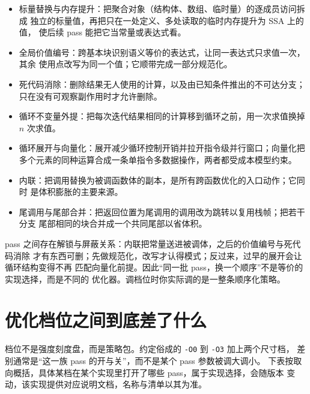 \documentclass[12pt,a4paper,fontset=fandol]{ctexbook}
\newcommand{\Sw}[1]{\texttt{#1}}
\newcommand{\Mx}[1]{\textsf{#1}}
\begin{document}
\begin{itemize}
  \item 标量替换与内存提升：把聚合对象（结构体、数组、临时量）的逐成员访问拆成
        独立的标量值，再把只在一处定义、多处读取的临时内存提升为 \Mx{SSA} 上的值，
        使后续 \Mx{pass} 能把它当常量或表达式看。
  \item 全局价值编号：跨基本块识别语义等价的表达式，让同一表达式只求值一次，其余
        使用点改写为同一个值；它顺带完成一部分规范化。
  \item 死代码消除：删除结果无人使用的计算，以及由已知条件推出的不可达分支；
        只在没有可观察副作用时才允许删除。
  \item 循环不变量外提：把每次迭代结果相同的计算移到循环之前，用一次求值换掉
        $n$ 次求值。
  \item 循环展开与向量化：展开减少循环控制开销并拉开指令级并行窗口；向量化把
        多个元素的同种运算合成一条单指令多数据操作，两者都受成本模型约束。
  \item 内联：把调用替换为被调函数体的副本，是所有跨函数优化的入口动作；它同时
        是体积膨胀的主要来源。
  \item 尾调用与尾部合并：把返回位置为尾调用的调用改为跳转以复用栈帧；把若干分支
        尾部相同的块合并成一个共同尾部以省体积。
\end{itemize}

\begin{guideline}[title={顺序本身就是策略}]
\Mx{pass} 之间存在解锁与屏蔽关系：内联把常量送进被调体，之后的价值编号与死代码消除
才有东西可删；先做规范化，改写才认得模式；反过来，过早的展开会让循环结构变得不再
匹配向量化前提。因此“同一批 \Mx{pass}，换一个顺序”不是等价的实现选择，而是不同的
优化器。调档位时你实际调的是一整条顺序化策略。
\end{guideline}

\section{优化档位之间到底差了什么}\label{sec:cl05-levels}

档位不是强度刻度盘，而是策略包。约定俗成的 \Sw{-O0} 到 \Sw{-O3} 加上两个尺寸档，
差别通常是“这一族 \Mx{pass} 的开与关”，而不是某个 \Mx{pass} 参数被调大调小。
下表按取向概括，具体某档在某个实现里打开了哪些 \Mx{pass}，属于实现选择，会随版本
变动，该实现提供对应说明文档，名称与清单以其为准。
\end{document}

